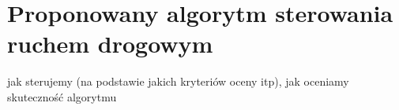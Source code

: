 \chapter{Proponowany algorytm sterowania ruchem drogowym}
jak sterujemy (na podstawie jakich kryteriów oceny itp), jak oceniamy skuteczność algorytmu